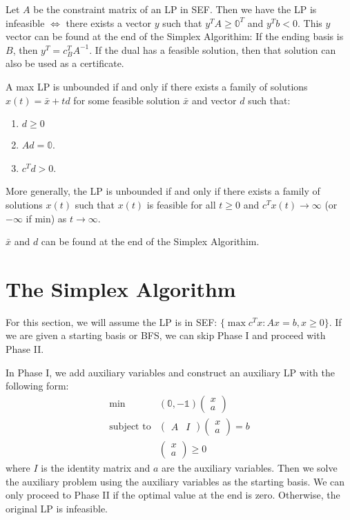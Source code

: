 \documentclass[a4paper]{report}
\newcommand\m[1]{\begin{pmatrix}#1\end{pmatrix}}
\begin{document}
\begin{definition}\label{infeasibility}
  Let $A$ be the constraint matrix of an LP in SEF. Then we have the LP is infeasible $\Longleftrightarrow$ there exists a vector $y$ such that $y^T A \geq \mathbb 0^T$ and $y^T b < 0$. This $y$ vector can be found at the end of the Simplex Algorithim: If the ending basis is $B$, then $y^T = c_B^T A^{-1}$. If the dual has a feasible solution, then that solution can also be used as a certificate.
\end{definition}

\begin{definition}\label{unboundedness}
  A max LP is unbounded if and only if there exists a family of solutions $x(t) = \bar x + td$ for some feasible solution $\bar x$ and vector $d$ such that:
  \begin{enumerate}
    \item $d \geq 0$
    \item $Ad = \mathbb 0$.
    \item $c^T d > 0$.
  \end{enumerate}

  More generally, the LP is unbounded if and only if there exists a family of solutions $x(t)$ such that $x(t)$ is feasible for all $t \geq 0$ and $c^Tx(t) \rightarrow \infty$ (or $-\infty$ if min) as $t \rightarrow \infty$.
  
  $\bar x$ and $d$ can be found at the end of the Simplex Algorithim.
\end{definition}

\section{The Simplex Algorithm}
For this section, we will assume the LP is in SEF: $\{\max c^T x : Ax = b, x \geq 0\}$. If we are given a starting basis or BFS, we can skip Phase I and proceed with Phase II. 

\begin{definition}\label{phase:i}
  In Phase I, we add auxiliary variables and construct an auxiliary LP with the following form:
  \begin{equation*}
    \begin{aligned}
      \min & (\mathbb 0, -\mathbb 1) \m{x \\ a} \\
      \text{subject to} & \m{A & I} \m{x \\ a} = b \\
      & \m{x \\ a} \geq 0
    \end{aligned}
  \end{equation*}
  where $I$ is the identity matrix and $a$ are the auxiliary variables. Then we solve the auxiliary problem using the auxiliary variables as the starting basis. We can only proceed to Phase II if the optimal value at the end is zero. Otherwise, the original LP is infeasible.
\end{definition}
\end{document}
